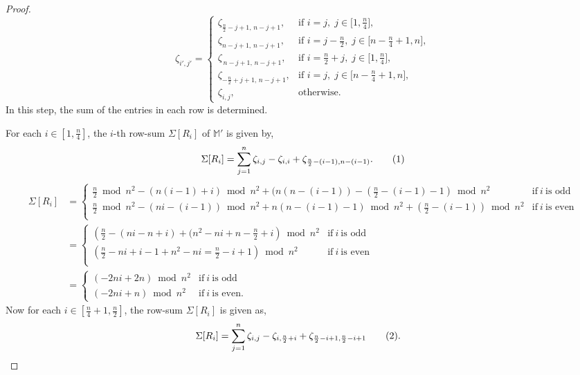 \documentclass[preprint,11pt]{elsarticle}
\newcommand\numberthis{\addtocounter{equation}{1}\tag{\theequation}}
\begin{document}
\begin{proof}
\[\zeta_{i',j'} =
\begin{cases}
   \zeta_{\tfrac{n}{2}-j+1,\, n-j+1}, & \text{if } i=j,\; j \in \big[1, \tfrac{n}{4}\big], \\[6pt]
    \zeta_{n-j+1,\, n-j+1}, & \text{if } i=j-\tfrac{n}{2} ,\; j \in \big[n-\tfrac{n}{4}+1, n\big], \\[6pt]
   \zeta_{\,n-j+1,\, n-j+1}, & \text{if } i=\tfrac{n}{2}+j,\; j \in \big[1, \tfrac{n}{4}\big], \\[6pt]
    \zeta_{-\frac{n}{2}+j+1,\, n-j+1}, & \text{if } i=j ,\; j \in \big[n-\tfrac{n}{4}+1, n\big], \\[6pt]
   \zeta_{i,j}, & \text{otherwise}.
\end{cases}
\]
\noindent In this step, the sum of the entries in each row is determined. 

\noindent For each $i\in [1, \frac{n}{4}]$, the $i$-th row-sum $\Sigma[R_i]$  of $\mathbb{M}'$ is given by,
 \[\Sigma[R_i] = \sum_{j=1}^{n}\zeta_{i,j}-\zeta_{i,i}+\zeta_{\frac{n}{2}-(i-1), n -(i-1)}. \numberthis \label{7}\]
\begin{align*}
  \Sigma[R_i] & = \begin{cases}
        \frac{n}{2}\bmod{n^2}-(n(i-1)+i)\bmod{n^2}+(n(n-(i-1))-(\frac{n}{2}-(i-1)-1)\bmod{n^2} & \text{if}~ i ~ \text{is odd}\\
\frac{n}{2}\bmod{n^2}-(ni-(i-1))\bmod{n^2}+n(n-(i-1)-1)\bmod{n^2}+(\frac{n}{2}-(i-1))\bmod{n^2}& \text{if}~ i ~ \text{is even}\\
    \end{cases}\\[6pt]
    & =\begin{cases}
        \left(\frac{n}{2}-(ni-n+i)+(n^2-ni+n-\frac{n}{2}+i\right)\bmod{n^2}& \text{if}~ i ~ \text{is odd}\\
 \left(\frac{n}{2}-ni+i-1+n^2-ni=\frac{n}{2}-i+1\right)\bmod{n^2}& \text{if}~ i ~ \text{is even}\\
    \end{cases}\\[6pt]
    & = \begin{cases}
       (-2ni+2n)\bmod{n^2}& \text{if}~ i ~ \text{is odd}\\
    (-2ni+n)\bmod{n^2}& \text{if}~ i ~ \text{is even}.
    \end{cases}
\end{align*}
Now for each $i\in [\frac{n}{4}+1, \frac{n}{2}]$, the row-sum $\Sigma[R_i]$ is given as, 
\begin{align*}
    \Sigma[R_i]&= \sum_{j=1}^{n}\zeta_{i,j}-\zeta_{i, \frac{n}{2}+i}+\zeta_{\frac{n}{2}-i+1,\frac{n}{2}-i+1}\numberthis.

\end{align*}
\end{proof}
\end{document}
